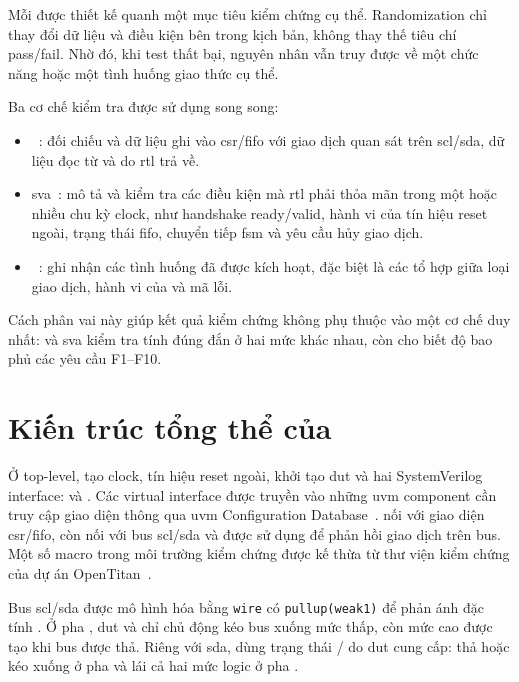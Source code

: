 Mỗi \VirtualSequence{} được thiết kế quanh một mục tiêu kiểm chứng cụ thể. Randomization chỉ
thay đổi dữ liệu và điều kiện bên trong kịch bản, không thay thế tiêu chí pass/fail. Nhờ đó,
khi test thất bại, nguyên nhân vẫn truy được về một chức năng hoặc một tình huống giao thức
cụ thể.

Ba cơ chế kiểm tra được sử dụng song song:
\begin{itemize}
	\item \Scoreboard{}~\cite{uvm12_ug}: đối chiếu \CommandDescriptor{} và dữ liệu ghi vào \gls{csr}/\gls{fifo}
	      với giao dịch quan sát trên \gls{scl}/\gls{sda}, dữ liệu đọc từ \RxFifo{} và \ResponseDescriptor{} do \gls{rtl} trả về.
	\item \gls{sva}~\cite{ieee1800}: mô tả và kiểm tra các điều kiện mà \gls{rtl} phải thỏa mãn trong một hoặc
	      nhiều chu kỳ clock, như handshake ready/valid, hành vi của tín hiệu reset ngoài, trạng
	      thái \gls{fifo}, chuyển tiếp \gls{fsm} và yêu cầu hủy giao dịch.
	\item \FunctionalCoverage{}~\cite{uvm12_ug}: ghi nhận các tình huống đã được kích hoạt, đặc biệt là các tổ
	      hợp giữa loại giao dịch, hành vi của \Target{} và mã lỗi.
\end{itemize}

Cách phân vai này giúp kết quả kiểm chứng không phụ thuộc vào một cơ chế duy nhất: \Scoreboard{} và \gls{sva} kiểm
tra tính đúng đắn ở hai mức khác nhau, còn \FunctionalCoverage{} cho biết độ bao phủ các yêu cầu F1--F10.

\section{Kiến trúc tổng thể của \Testbench{}}
\label{sec:ver-arch}

Ở top-level, \Testbench{} tạo clock, tín hiệu reset ngoài, khởi tạo \gls{dut} và hai
SystemVerilog interface: \RegisterInterface{} và \IThreeCInterface{}. Các virtual
interface được truyền vào những \gls{uvm} component cần truy cập giao diện thông qua \gls{uvm}
Configuration Database~\cite{uvm12_ref}. \RegisterInterface{} nối với giao diện \gls{csr}/\gls{fifo}, còn \IThreeCInterface{} nối
với bus \gls{scl}/\gls{sda} và được \IThreeCAgent{} sử dụng để phản hồi giao dịch trên bus. Một số macro
trong môi trường kiểm chứng được kế thừa từ thư viện kiểm chứng của dự án OpenTitan~\cite{opentitan_dv}.

Bus \gls{scl}/\gls{sda} được mô hình hóa bằng \texttt{wire} có \texttt{pullup(weak1)} để phản ánh đặc tính
\OpenDrain{}. Ở pha \OpenDrain{}, \gls{dut} và \IThreeCAgent{} chỉ chủ động kéo bus xuống mức thấp,
còn mức cao được tạo khi bus được thả. Riêng với \gls{sda}, \Testbench{} dùng trạng thái
\OpenDrain{}/\PushPull{} do \gls{dut} cung cấp: thả hoặc kéo xuống ở pha \OpenDrain{} và lái cả hai
mức logic ở pha \PushPull{}.

